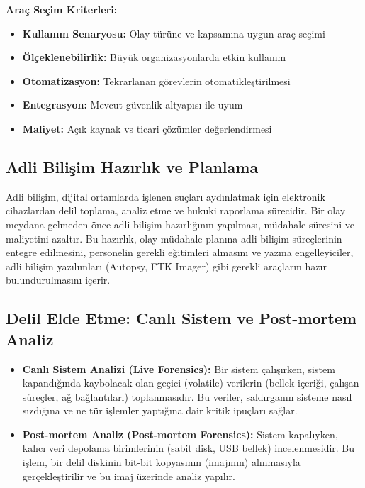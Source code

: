 \begin{itemize}
\textbf{Araç Seçim Kriterleri:}
\begin{itemize}
    \item \textbf{Kullanım Senaryosu:} Olay türüne ve kapsamına uygun araç seçimi
    \item \textbf{Ölçeklenebilirlik:} Büyük organizasyonlarda etkin kullanım
    \item \textbf{Otomatizasyon:} Tekrarlanan görevlerin otomatikleştirilmesi
    \item \textbf{Entegrasyon:} Mevcut güvenlik altyapısı ile uyum
    \item \textbf{Maliyet:} Açık kaynak vs ticari çözümler değerlendirmesi
\end{itemize}

\subsection{Adli Bilişim Hazırlık ve Planlama}

Adli bilişim, dijital ortamlarda işlenen suçları aydınlatmak için elektronik cihazlardan delil toplama, analiz etme ve hukuki raporlama sürecidir. Bir olay meydana gelmeden önce adli bilişim hazırlığının yapılması, müdahale süresini ve maliyetini azaltır. Bu hazırlık, olay müdahale planına adli bilişim süreçlerinin entegre edilmesini, personelin gerekli eğitimleri almasını ve yazma engelleyiciler, adli bilişim yazılımları (Autopsy, FTK Imager) gibi gerekli araçların hazır bulundurulmasını içerir.

\subsection{Delil Elde Etme: Canlı Sistem ve Post-mortem Analiz}

\begin{itemize}
    \item \textbf{Canlı Sistem Analizi (Live Forensics):} Bir sistem çalışırken, sistem kapandığında kaybolacak olan geçici (volatile) verilerin (bellek içeriği, çalışan süreçler, ağ bağlantıları) toplanmasıdır. Bu veriler, saldırganın sisteme nasıl sızdığına ve ne tür işlemler yaptığına dair kritik ipuçları sağlar.
    \item \textbf{Post-mortem Analiz (Post-mortem Forensics):} Sistem kapalıyken, kalıcı veri depolama birimlerinin (sabit disk, USB bellek) incelenmesidir. Bu işlem, bir delil diskinin bit-bit kopyasının (imajının) alınmasıyla gerçekleştirilir ve bu imaj üzerinde analiz yapılır.
\end{itemize}


\end{itemize}
